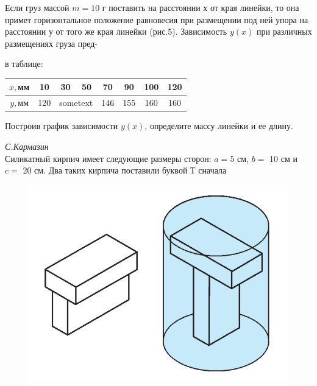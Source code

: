 \begin{multicols}{2}
 Если груз массой $m = 10$ г поставить на расстоянии $х$ от края линейки, то она примет горизонтальное положение равновесия при размещении под ней упора на расстоянии у от того же края линейки (рис.5). Зависимость $y(x)$ при различных размещениях груза пред-\\
\begin{figure}[H]
\end{figure}
 в таблице:
\begin{center}
\begin{tabular} {|c|c|c|c|c|c|c|c|}
 \hline
 $x, $мм & 10 & 30 & 50 & 70 & 90 & 100 & 120 \\
 \hline
 $y, $мм & 120 & \multicolumn{2}{l|}{sometext} & 146 & 155 & 160 & 160 \\
\hline
\end{tabular}
\end{center}
Построив график зависимости $y(x)$, определите массу линейки и ее длину.\\
\strut\hfill {\it С.Кармазин}\\

 Силикатный кирпич имеет следующие размеры сторон: $a = 5$ см, $b = $ 10 см и $c = $ 20 см. Два таких кирпича поставили буквой $Т$ сначала
\setlength{\intextsep}{-9pt}
\setlength{\columnsep}{-5pt}
\begin{figure}
 \begin{center}
  \includegraphics[scale = 0.2]{shapes.png}
 \end{center}
\end{figure}


\end{multicols}
